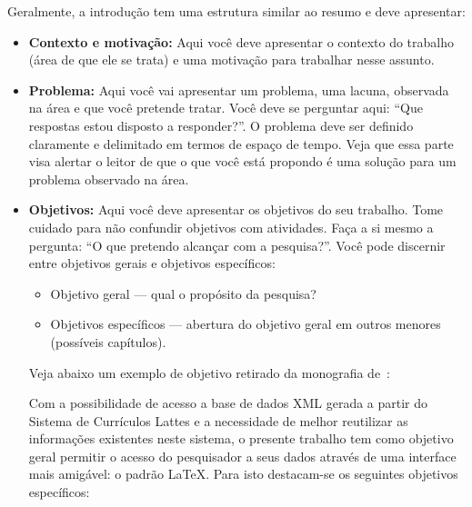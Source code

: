 \documentclass[twoside,english,brazilian]{UNISINOSartigo}
\begin{document}
Geralmente, a introdução tem uma estrutura similar ao resumo e deve apresentar:
\begin{itemize}
	\item \textbf{Contexto e motivação:} Aqui você deve apresentar o contexto do trabalho (área de que ele se trata) e uma motivação para trabalhar nesse assunto.
	\item \textbf{Problema:} Aqui você vai apresentar um problema, uma lacuna, observada na área e que você pretende tratar. Você deve se perguntar aqui: ``Que respostas estou disposto a responder?''. O problema deve ser definido claramente e delimitado em termos de espaço de tempo. Veja que essa parte visa alertar o leitor de que o que você está propondo é uma solução para um problema observado na área. 
	\item \textbf{Objetivos:} Aqui você deve apresentar os objetivos do seu trabalho. Tome cuidado para não confundir objetivos com atividades.   Faça a si mesmo a pergunta: ``O que pretendo alcançar com a pesquisa?''. Você pode discernir entre objetivos gerais e objetivos específicos:
	\begin{itemize}
		\item Objetivo geral --- qual o propósito da pesquisa?
		\item Objetivos específicos --- abertura do objetivo geral em outros menores (possíveis capítulos).
	\end{itemize}
	Veja abaixo um exemplo de objetivo retirado da monografia de~:

	Com a possibilidade de acesso a base de dados XML gerada a partir do Sistema de Currículos Lattes e a necessidade de melhor reutilizar as informações existentes neste sistema, o presente trabalho tem como objetivo geral permitir o acesso do pesquisador a seus dados através de uma interface mais amigável: o padrão LaTeX. Para isto destacam-se os seguintes objetivos específicos:
\end{itemize}
\end{document}
